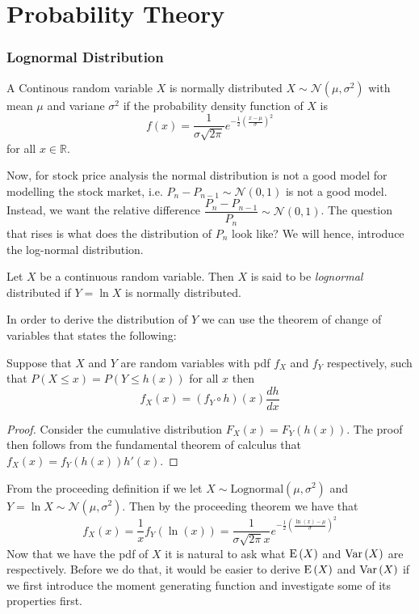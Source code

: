 \part{Probability Theory}
\section{Lognormal Distribution}
\begin{definition}
	A Continous random variable $X$ is normally distributed $X\sim\mathcal{N}(\mu, \sigma^2)$ with mean $\mu$ and variane $\sigma^2$ if the probability density function of $X$ is
	$$
	f(x) = \frac{1}{\sigma \sqrt{2\pi}}e^{-\frac{1}{2}\left(\frac{x - \mu}{\sigma}\right)^2}
	$$
	for all $x\in\mathbb R$.
\end{definition}
Now, for stock price analysis the normal distribution is not a good model for modelling the stock market, i.e. $P_n - P_{n-1} \sim \mathcal{N}(0, 1)$ is not a good model. Instead, we want the relative difference $\dfrac{P_n - P_{n-1}}{P_n} \sim \mathcal N(0, 1)$. The question that rises is what does the distribution of $P_n$ look like? We will hence, introduce the log-normal distribution.
\begin{definition}
	Let $X$ be a continuous random variable. Then $X$ is said to be \emph{lognormal} distributed if $Y = \ln X$ is normally distributed.
\end{definition}
In order to derive the distribution of $Y$ we can use the theorem of change of variables that states the following:
\begin{theorem}
	Suppose that $X$ and $Y$ are random variables with pdf $f_X$ and $f_Y$ respectively, such that $P(X \leq x) = P(Y \leq h(x))$ for all $x$ then
	$$
	f_X(x) = \left(f_Y\circ h\right)(x)\frac{dh}{dx}
	$$
	\begin{proof}
		Consider the cumulative distribution $F_X(x) = F_Y(h(x))$. The proof then follows from the fundamental theorem of calculus that $f_X(x) = f_Y(h(x))h'(x)$.
	\end{proof}
\end{theorem}
From the proceeding definition if we let $X\sim\mathrm{Lognormal}(\mu, \sigma^2)$ and $Y = \ln X \sim\mathcal{N}(\mu,\sigma^2)$. Then by the proceeding theorem we have that
$$
f_X(x) = \frac{1}{x}f_Y(\ln(x)) = \frac{1}{\sigma\sqrt{2\pi}x}e^{-\frac{1}{2}\left(\frac{\ln(x)-\mu}{\sigma}\right)^2}
$$
Now that we have the pdf of $X$ it is natural to ask what $\mathrm{E}\left(X\right)$ and $\mathrm{Var}\left(X\right)$ are respectively. Before we do that, it would be easier to derive $\mathrm{E}\left(X\right)$ and $\mathrm{Var}\left(X\right)$ if we first introduce the moment generating function and investigate some of its properties first.
